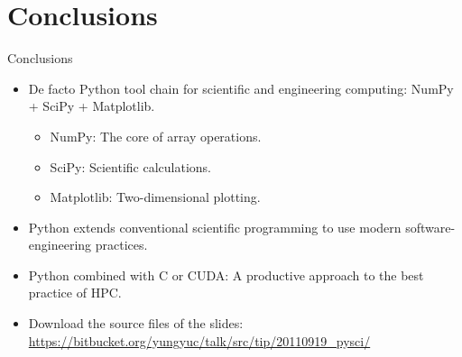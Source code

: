 \documentclass[dvips,xcolor=pst]{beamer}
\begin{document}
\section{Conclusions}

\begin{frame}{
%
Conclusions
%
}
\begin{itemize} \large
  \item De facto Python tool chain for scientific and engineering computing:
  NumPy + SciPy + Matplotlib.
  \begin{itemize} \large
    \item NumPy: The core of array operations.
    \item SciPy: Scientific calculations.
    \item Matplotlib: Two-dimensional plotting.
  \end{itemize}
  \item Python extends conventional scientific programming to use modern
  software-engineering practices.
  \item Python combined with C or CUDA: A productive approach to the best
  practice of HPC.
  \item Download the source files of the slides:
  {\small\url{https://bitbucket.org/yungyuc/talk/src/tip/20110919_pysci/}}
\end{itemize}
\end{frame}
\end{document}

